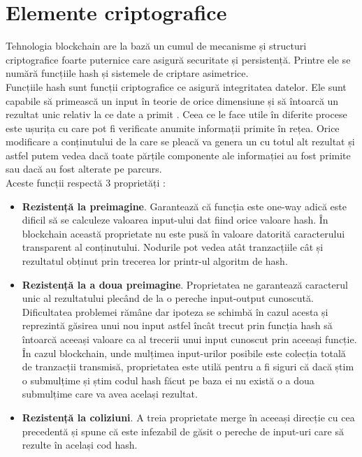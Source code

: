 \clearpage

\section{Elemente criptografice}

Tehnologia blockchain are la bază un cumul de mecanisme și structuri criptografice foarte puternice care asigură securitate și persistență. Printre ele se numără funcțiile hash și sistemele de criptare asimetrice.\\

Funcțiile hash sunt funcții criptografice ce asigură integritatea datelor. Ele sunt capabile să primească un input în teorie de orice dimensiune și să întoarcă un rezultat unic relativ la ce date a primit \cite{Blockchain_Overview_NIST}. Ceea ce le face utile în diferite procese este ușurița cu care pot fi verificate anumite informații primite în rețea. Orice modificare a conținutului de la care se pleacă va genera un cu totul alt rezultat și astfel putem vedea dacă toate părțile componente ale informației au fost primite sau dacă au fost alterate pe parcurs.\\

Aceste funcții respectă 3 proprietăți \cite{Blockchain_Overview_NIST}:
\begin{itemize}
    \item \textbf{Rezistență la preimagine}. 
    Garantează că funcția este one-way adică este dificil să se calculeze valoarea input-ului dat fiind orice valoare hash. În blockchain această proprietate nu este pusă în valoare datorită caracterului transparent al conținutului. Nodurile pot vedea atât tranzacțiile cât și rezultatul obținut prin trecerea lor printr-ul algoritm de hash.
    
    \item \textbf{Rezistență la a doua preimagine}. 
    Proprietatea ne garantează caracterul unic al rezultatului plecând de la o pereche input-output cunoscută. Dificultatea problemei rămâne dar ipoteza se schimbă în cazul acesta și reprezintă găsirea unui nou input astfel încât trecut prin funcția hash să întoarcă aceeași valoare ca al trecerii unui input cunoscut prin aceeași funcție. În cazul blockchain, unde mulțimea input-urilor posibile este colecția totală de tranzacții transmisă, proprietatea este utilă pentru a fi siguri că dacă știm o submulțime și știm codul hash făcut pe baza ei nu există o a doua submulțime care va avea același rezultat.
    
    \item \textbf{Rezistență la coliziuni}. 
    A treia proprietate merge în aceeași direcție cu cea precedentă și spune că este infezabil de găsit o pereche de input-uri care să rezulte în același cod hash. 
\end{itemize}

